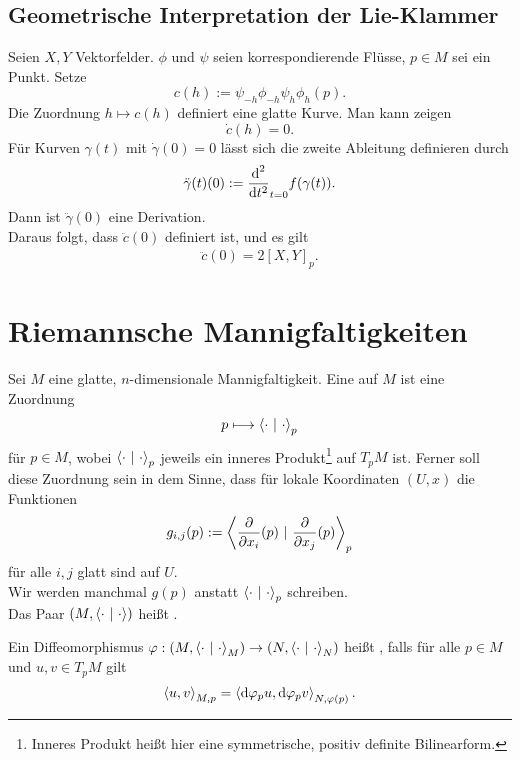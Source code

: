 \subsection{Geometrische Interpretation der Lie-Klammer}
Seien $X,Y$ Vektorfelder. $\phi$ und $\psi$ seien korrespondierende Flüsse, $p\in M$ sei ein Punkt. Setze
\[ c(h) := \psi_{-h}\phi_{-h}\psi_h\phi_h(p). \]
Die Zuordnung $h \mapsto c(h)$ definiert eine glatte Kurve. Man kann zeigen
\[ \dot{c}(h) = 0. \]
Für Kurven $\gamma(t)$ mit $\dot{\gamma}(0) = 0$ lässt sich die zweite Ableitung definieren durch
\[ \ddot{\gamma}(t)(0):= \frac{\text{d}^2}{\text{d} t^2}_{t = 0} f(\gamma(t)) .\]
Dann ist $\ddot{\gamma}(0)$ eine Derivation.\\
Daraus folgt, dass $\ddot{c}(0)$ definiert ist, und es gilt
\begin{align*}
\ddot{c}(0) = 2[X,Y]_p.
\end{align*}

\newpage
\section{Riemannsche Mannigfaltigkeiten}
Sei $M$ eine glatte, $n$-dimensionale Mannigfaltigkeit.
\Def{}
Eine  auf $M$ ist eine Zuordnung
\begin{align*}
p \longmapsto \left<\cdot ~|~\cdot\right>_p
\end{align*}
für $p\in M$, wobei $\left<\cdot ~|~\cdot\right>_p$ jeweils ein inneres Produkt\footnote{Inneres Produkt heißt hier eine symmetrische, positiv definite Bilinearform.} auf $T_pM$ ist. Ferner soll diese Zuordnung sein in dem Sinne, dass für lokale Koordinaten $(U,x)$ die Funktionen
\begin{align*}
g_{i,j}(p) := \left<\frac{\partial }{\partial x_i}(p) ~|~ \frac{\partial }{\partial x_j}(p) \right>_p
\end{align*} 
für alle $i,j$ glatt sind auf $U$.\\
Wir werden manchmal $g(p)$ anstatt $\left<\cdot ~|~ \cdot\right>_p$ schreiben.\\
Das Paar $(M, \left<\cdot~|~ \cdot\right>)$ heißt .

\Def{}
Ein Diffeomorphismus $\varphi: (M, \left<\cdot~|~\cdot\right>_M) \overset{}{\rightarrow} (N, \left<\cdot~|~\cdot\right>_N)$ heißt , falls für alle $p \in M$ und $u,v \in T_pM$ gilt
\[ \left<u,v\right>_{M,p} = \left< \text{d} \varphi_pu, \text{d} \varphi_pv\right>_{N,\varphi(p)}. \]


